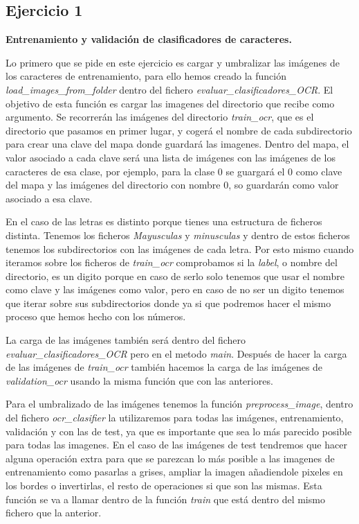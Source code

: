 \documentclass[a4paper, 12pt]{article}
\begin{document}
\subsection{Ejercicio 1}
\textbf{Entrenamiento y validación de clasificadores de caracteres.}

Lo primero que se pide en este ejercicio es cargar y umbralizar las imágenes de los caracteres de entrenamiento, para ello hemos creado la función \textit{load\_images\_from\_folder} dentro del fichero \textit{evaluar\_clasificadores\_OCR}. El objetivo de esta función es cargar las imagenes del directorio que recibe como argumento. Se recorrerán las imágenes del directorio \textit{train\_ocr}, que es el directorio que pasamos en primer lugar, y cogerá el nombre de cada subdirectorio para crear una clave del mapa donde guardará las imagenes. Dentro del mapa, el valor asociado a cada clave será una lista de imágenes con las imágenes de los caracteres de esa clase, por ejemplo, para la clase 0 se guargará el 0 como clave del mapa y las imágenes del directorio con nombre 0, so guardarán como valor asociado a esa clave. 

En el caso de las letras es distinto porque tienes una estructura de ficheros distinta. Tenemos los ficheros \textit{Mayusculas} y \textit{minusculas} y dentro de estos ficheros tenemos los subdirectorios con las imágenes de cada letra. Por esto mismo cuando iteramos sobre los ficheros de \textit{train\_ocr} comprobamos si la \textit{label}, o nombre del directorio, es un digito porque en caso de serlo solo tenemos que usar el nombre como clave y las imágenes como valor, pero en caso de no ser un digito tenemos que iterar sobre sus subdirectorios donde ya si que podremos hacer el mismo proceso que hemos hecho con los números. 

La carga de las imágenes también será dentro del fichero \textit{evaluar\_clasificadores\_OCR} pero en el metodo \textit{main}. Después de hacer la carga de las imágenes de \textit{train\_ocr} también hacemos la carga de las imágenes de \textit{validation\_ocr} usando la misma función que con las anteriores.  

Para el umbralizado de las imágenes tenemos la función \textit{preprocess\_image}, dentro del fichero \textit{ocr\_clasifier} la utilizaremos para todas las imágenes, entrenamiento, validación y con las de test, ya que es importante que sea lo más parecido posible para todas las imagenes. En el caso de las imágenes de test tendremos que hacer alguna operación extra para que se parezcan lo más posible a las imagenes de entrenamiento como pasarlas a grises, ampliar la imagen añadiendole pixeles en los bordes o invertirlas, el resto de operaciones si que son las mismas. Esta función se va a llamar dentro de la función \textit{train} que está dentro del mismo fichero que la anterior. 
\end{document}
